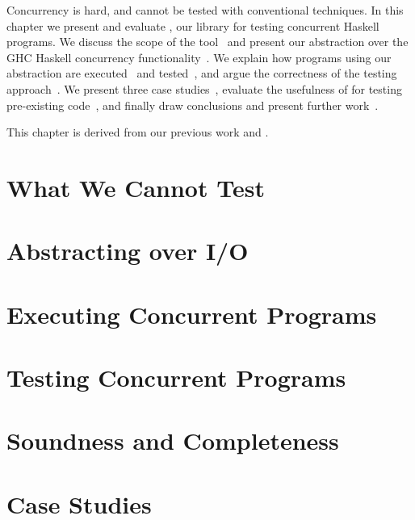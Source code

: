 \chapstart Concurrency is hard, and cannot be tested with conventional techniques.
In this chapter we present and evaluate \dejafu{}, our library for testing concurrent Haskell
programs.  We discuss the scope of the tool~ and present our abstraction over the
GHC Haskell concurrency functionality~.  We explain how programs using our
abstraction are executed~ and tested~, and argue the
correctness of the testing approach~.  We present three case
studies~, evaluate the usefulness of \dejafu{} for testing pre-existing
code~, and finally draw conclusions and present further
work~.

This chapter is derived from our previous work \cite{walker2015} and \cite{YCS-2016-503}.

\section{What We Cannot Test}
\label{sec:dejafu-scope}

\blindtext

\section{Abstracting over I/O}
\label{sec:dejafu-monadconc}

\blindtext

\section{Executing Concurrent Programs}
\label{sec:dejafu-execution}

\blindtext

\section{Testing Concurrent Programs}
\label{sec:dejafu-testing}

\blindtext

\section{Soundness and Completeness}
\label{sec:dejafu-correctness}

\blindtext

\section{Case Studies}
\label{sec:dejafu-casestudies}

